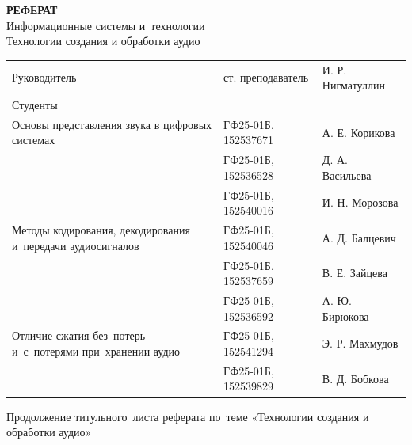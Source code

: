 \documentclass{ou}
\begin{document}
\thispagestyle{empty}
\begin{center}
\shortstack{\FGAVO}\vspace{4\baselineskip}
\textbf{РЕФЕРАТ}\\
Информационные системы и~технологии\\
Технологии создания и обработки аудио\vspace{2\baselineskip}\end{center}
\begin{flushleft}
\doublespacing
\begin{tabularx}{\textwidth}{@{} p{} l l @{}}
Руководитель & ст. преподаватель & И. Р. Нигматуллин\\
Студенты     &                   &                  \\
\multirow{-2.27}{\hsize}{\singlespacing Основы представления звука в цифровых системах}
             & ГФ25-01Б, 152537671 & А. Е. Корикова\\
             & ГФ25-01Б, 152536528 & Д. А. Васильева\\
             & ГФ25-01Б, 152540016 & И. Н. Морозова\\
\multirow{-2.27}{\hsize}{\singlespacing Методы кодирования, декодирования и~передачи аудиосигналов}
             & ГФ25-01Б, 152540046 & А. Д. Балцевич\\
             & ГФ25-01Б, 152537659 & В. Е. Зайцева\\
             & ГФ25-01Б, 152536592 & А. Ю. Бирюкова\\
\multirow{-2.27}{\hsize}{\singlespacing Отличие сжатия без~потерь и~с~потерями при~хранении аудио}
             & ГФ25-01Б, 152541294 & Э. Р. Махмудов\\
             & ГФ25-01Б, 152539829 & В. Д. Бобкова\\
\end{tabularx}
\end{flushleft}
\vspace*{\fill}
\begin{center}
\city
\end{center}
\newpage
\thispagestyle{empty}
Продолжение титульного~листа реферата по~теме «Технологии создания и обработки аудио»
\end{document}
